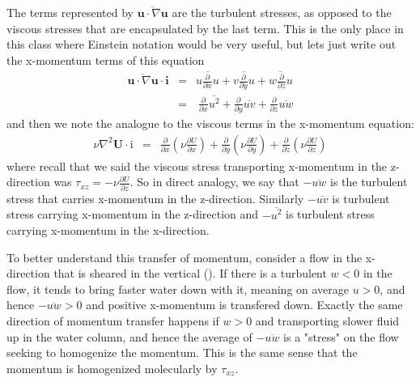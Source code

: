 \documentclass[11pt]{article}
\begin{document}
The terms represented by  $\overline{\mathbf{u}\cdot\nabla \mathbf{u}}$ are the turbulent stresses, as opposed to the viscous stresses that are encapsulated by the last term.  This is the only place in this class where Einstein notation would be very useful, but lets just write out the x-momentum terms of this equation
\begin{eqnarray*}
    \overline{\mathbf{u}\cdot\nabla \mathbf{u}}\cdot\mathbf{i} & = &\overline{u \frac{\partial}{\partial x} u} + \overline{v\frac{\partial}{\partial y} u} + \overline{w\frac{\partial}{\partial z} u}  \\ & = &
\ \frac{\partial}{\partial x} \overline{u^2} + \frac{\partial}{\partial y} \overline{u v} + \frac{\partial}{\partial z} \overline{uw} 
\end{eqnarray*}
and then we note the analogue to the viscous terms in the x-momentum equation:
\begin{eqnarray*}
    \nu\nabla^2 \mathbf{U}\cdot\mathrm{i} & = & \frac{\partial}{\partial x}\left( \nu \frac{\partial U}{\partial x}\right) + \frac{\partial}{\partial y}\left( \nu \frac{\partial U}{\partial y}\right) + \frac{\partial}{\partial z}\left( \nu \frac{\partial U}{\partial z}\right) 
\end{eqnarray*}
where recall that we said the viscous stress transporting x-momentum in the z-direction was $\tau_{xz} = -\nu\frac{\partial U}{\partial z}$.  So in direct analogy, we say that $-\overline{uw}$ is the turbulent stress that carries x-momentum in the z-direction.  Similarly $-\overline{uv}$ is turbulent stress carrying x-momentum in the z-direction and $-\overline{u^2}$ is turbulent stress carrying x-momentum in the x-direction.  

To better understand this transfer of momentum, consider a  flow in the x-direction that is sheared in the vertical ().  If there is a turbulent $w<0$ in the flow, it tends to bring faster water down with it, meaning on average $u>0$, and hence $-\overline{uw} > 0$ and positive x-momentum is transfered down.  Exactly the same direction of momentum transfer happens if $w>0$ and transporting slower fluid up in the water column, and hence the average of $-\overline{uw}$ is a "stress" on the flow seeking to homogenize the momentum.  This is the same sense that the momentum is homogenized molecularly by $\tau_{xz}$.  
\end{document}

